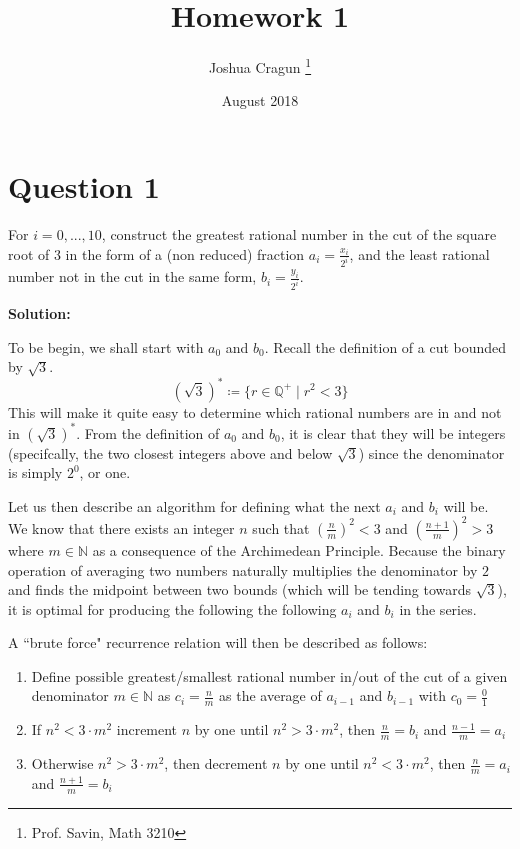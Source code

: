 \documentclass[12pt, letterpaper]{article}
\title{Homework 1}
\author{Joshua Cragun \thanks{Prof. Savin, Math 3210}}
\date{August 2018}
\begin{document}
\begin{titlepage}
\maketitle
\end{titlepage}

\section{Question 1}
For $i = 0, ..., 10$, construct the greatest rational number in the cut of the
square root of $3$ in the form of a (non reduced) fraction $a_i = \frac{x_i}{2^i}$,
and the least rational number not in the cut in the same form, $b_i = \frac{y_i}{2^i}$.

\noindent\textbf{Solution:}

To be begin, we shall start with $a_0$ and $b_0$. Recall the definition of a cut bounded by $\sqrt{3}$.
$$ (\sqrt{3})^{*} \coloneqq \{r \in \mathbb{Q}^+ \mid r^2 < 3 \} $$
This will make it quite easy to determine which rational numbers are in and not
in $(\sqrt{3})^{*}$. From the definition of $a_0$ and $b_0$, it is clear that they will
be integers (specifcally, the two closest integers above and below $\sqrt{3}$) since the denominator is simply $2^0$, or one.

Let us then describe an algorithm for defining what the next $a_i$ and $b_i$ will be.
We know that there exists an integer $n$ such that $(\frac{n}{m})^2 < 3$ and $(\frac{n + 1}{m})^2 > 3$ where $m \in \mathbb{N}$ as a consequence of the Archimedean Principle.
Because the binary operation of averaging two numbers naturally multiplies the denominator by $2$ and finds the midpoint between
two bounds (which will be tending towards $\sqrt{3}$), it is optimal for producing the following the following $a_i$ and $b_i$ in the series.

A ``brute force" recurrence relation will then be described as follows:

\begin{enumerate}
  \item Define possible greatest/smallest rational number in/out of the cut of a given denominator $m \in \mathbb{N}$ as $c_i = \frac{n}{m}$ as the average of $a_{i-1}$ and $b_{i-1}$ with $c_0 = \frac{0}{1}$
  \item If $n^2 < 3 \cdot m^2$ increment $n$ by one until $n^2 > 3 \cdot m^2$, then $\frac{n}{m} = b_i$ and $\frac{n - 1}{m} = a_i$
  \item Otherwise $n^2 > 3 \cdot m^2$, then decrement $n$ by one until $n^2 < 3 \cdot m^2$, then $\frac{n}{m} = a_i$ and $\frac{n + 1}{m} = b_i$
\end{enumerate}
\end{document}
